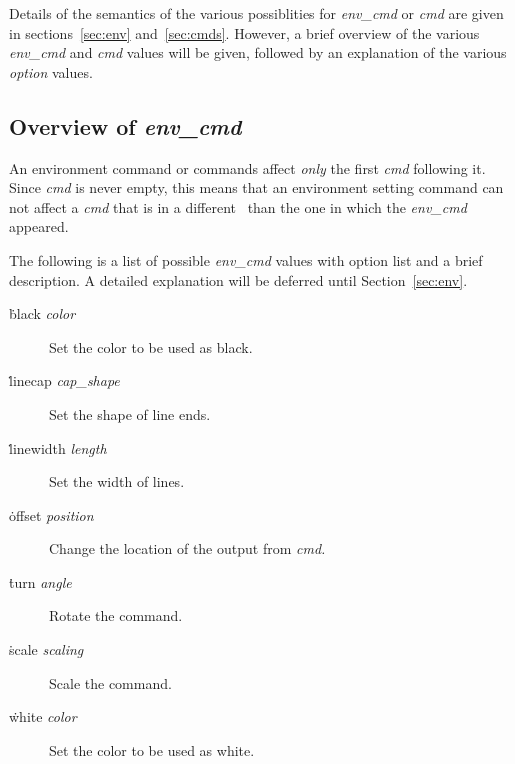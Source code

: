 Details of the semantics of the various possiblities for {\it env\_cmd\/}
or {\it cmd\/} are given in sections~\ref{sec:env} and~\ref{sec:cmds}.
However, a brief overview of the various {\it env\_cmd\/} and {\it cmd\/}
values will be given, followed by  an explanation of the various
{\it option\/} values.

\subsection{Overview of {\it env\_cmd}}
An environment command or commands affect {\it only\/} the first
{\it cmd\/} following it. Since {\it cmd\/} is never empty, this means
that an environment setting command can not affect a {\it cmd\/} that is
in a different \Special\ than the one in which the {\it env\_cmd\/}
appeared.

The following is a list of possible {\it env\_cmd\/} values with
option list and a brief description. A detailed explanation will be
deferred until Section~\ref{sec:env}.
\begin{description}
\item[\.{black} {\it color\/}] Set the color to be used as black.
\item[\.{linecap} {\it cap\_shape\/}] Set the shape of line ends.
\item[\.{linewidth} {\it length\/}] Set the width of lines.
\item[\.{offset} {\it position\/}] Change the location of the output
         from {\it cmd.\/}
\item[\.{turn} {\it angle\/}] Rotate the command.
\item[\.{scale} {\it scaling\/}] Scale the command.
\item[\.{white} {\it color\/}] Set the color to be used as white.
\end{description}

